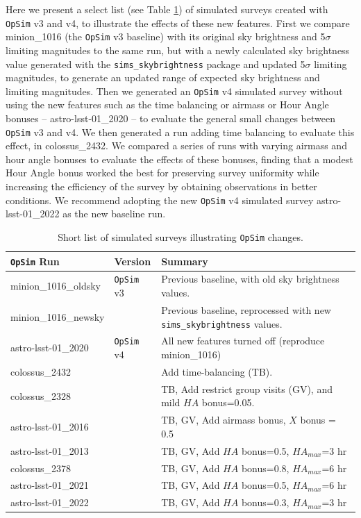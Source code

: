 \documentclass[DM,lsstdraft,authoryear,toc]{lsstdoc}
\newcommand{\opsim}{\texttt{OpSim}\xspace}
\newcommand{\simsky}{\texttt{sims\_skybrightness}\xspace}
\begin{document}
Here we present a select list (see Table \ref{tab:runlist}) of simulated surveys created with \opsim v3 and v4, to illustrate the effects of these new features. First we compare minion\_1016 (the \opsim v3 baseline) with its original sky brightness and 5$\sigma$ limiting magnitudes to the same run, but with a newly calculated sky brightness value generated with the \simsky package and updated 5$\sigma$ limiting magnitudes, to generate an updated range of expected sky brightness and limiting magnitudes. Then we generated an \opsim v4 simulated survey without using the new features such as the time balancing or airmass or Hour Angle bonuses -- astro-lsst-01\_2020 -- to evaluate the general small changes between \opsim v3 and v4. We then generated a run adding time balancing to evaluate this effect, in colossus\_2432.  We compared a series of runs with varying airmass and hour angle bonuses to evaluate the effects of these bonuses, finding that a modest Hour Angle bonus worked the best for preserving survey uniformity while increasing the efficiency of the survey by obtaining observations in better conditions. We recommend adopting the new \opsim v4 simulated survey astro-lsst-01\_2022 as the new baseline run.

\begin{table}[htp]
\caption{Short list of simulated surveys illustrating \opsim changes.}
\begin{center}
\begin{tabular}{ l | l | l }
\toprule
\opsim Run & Version & Summary \\
\midrule
minion\_1016\_oldsky & \opsim v3 & Previous baseline, with old sky brightness values. \\
minion\_1016\_newsky &  & Previous baseline, reprocessed with new \simsky values.\\
astro-lsst-01\_2020 & \opsim v4  & All new features turned off (reproduce minion\_1016) \\
colossus\_2432 &  & Add time-balancing (TB).\\
colossus\_2328 &  & TB, Add restrict group visits (GV), and mild $HA$ bonus=0.05. \\
astro-lsst-01\_2016 &  & TB, GV, Add airmass bonus, $X$ bonus = 0.5 \\
astro-lsst-01\_2013 &  & TB, GV, Add $HA$ bonus=0.5, $HA_{max}$=3 hr\\
colossus\_2378 &  &  TB, GV, Add $HA$ bonus=0.8, $HA_{max}$=6 hr\\
astro-lsst-01\_2021 & & TB, GV, Add $HA$ bonus=0.5, $HA_{max}$=6  hr\\
astro-lsst-01\_2022 &   & TB, GV, Add $HA$ bonus=0.3, $HA_{max}$=3 hr\\
\bottomrule
\end{tabular} 
\end{center}
\label{tab:runlist}
\end{table}
\end{document}
